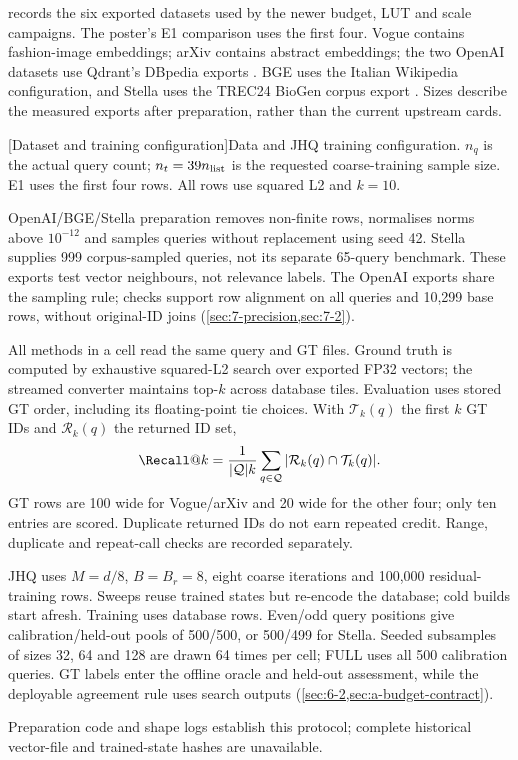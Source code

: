  records the six exported datasets used by the newer
budget, LUT and scale campaigns. The poster's E1 comparison uses the first
four. Vogue contains fashion-image embeddings; arXiv contains abstract
embeddings; the two OpenAI datasets use Qdrant's DBpedia exports
\cite{data_vogue,data_arxiv,data_openai1536,data_openai3072}.
BGE uses the Italian Wikipedia configuration, and Stella uses the
TREC24 BioGen corpus export \cite{data_bge,data_stella}. Sizes describe the
measured exports after preparation, rather than the current upstream cards.

\par\medskip\noindent\begin{minipage}{\linewidth}
\centering\captionsetup{hypcap=false}
[Dataset and training configuration]{Data and JHQ training configuration. $n_q$ is the actual query count;
$n_t=39n_{\rm list}$ is the requested coarse-training sample size. E1 uses
the first four rows. All rows use squared L2 and $k=10$.}
\label{tab:3-data}
\small\setlength{\tabcolsep}{4pt}

\end{minipage}\par\medskip

OpenAI/BGE/Stella preparation removes non-finite rows, normalises norms above $10^{-12}$ and samples queries without replacement using seed 42. Stella supplies 999 corpus-sampled queries, not its separate 65-query benchmark. These exports test vector neighbours, not relevance labels. The OpenAI exports share the sampling rule; checks support row alignment on all queries and 10,299 base rows, without original-ID joins (\cref{sec:7-precision,sec:7-2}).

All methods in a cell read the same query and GT files. Ground truth is
computed by exhaustive squared-L2 search over exported FP32 vectors; the
streamed converter maintains top-$k$ across database tiles. Evaluation uses
stored GT order, including its floating-point tie choices. With
$\mathcal T_k(q)$ the first $k$ GT IDs and $\mathcal R_k(q)$ the returned
ID set,
\begin{equation}
\Recall@k=\frac{1}{|\mathcal Q|k}
\sum_{q\in\mathcal Q}|\mathcal R_k(q)\cap\mathcal T_k(q)|.
\label{eq:3-recall}
\end{equation}
GT rows are 100 wide for Vogue/arXiv and 20 wide for the other four;
only ten entries are scored. Duplicate returned IDs do not earn repeated
credit. Range, duplicate and repeat-call checks are recorded separately.

JHQ uses $M=d/8$, $B=B_r=8$, eight coarse iterations and 100,000 residual-training rows. Sweeps reuse trained states but re-encode the database; cold builds start afresh. Training uses database rows. Even/odd query positions give calibration/held-out pools of 500/500, or 500/499 for Stella.
Seeded subsamples of sizes
32, 64 and 128 are drawn 64 times per cell; FULL uses all 500 calibration
queries. GT labels enter the offline oracle and held-out assessment, while
the deployable agreement rule uses search outputs
(\cref{sec:6-2,sec:a-budget-contract}).

Preparation code and shape logs establish this protocol; complete historical
vector-file and trained-state hashes are unavailable.
